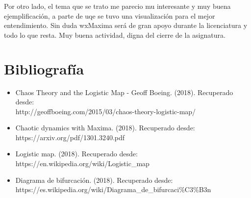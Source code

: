 \documentclass[12pt]{article}
\begin{document}
Por otro lado, el tema que se trato me parecio mu interesante y muy buena ejemplificación, a parte de uqe se tuvo una visualización para el mejor entendimiento. Sin duda wxMaxima será de gran apoyo durante la licenciatura y todo lo que resta. Muy buena actividad, digna del cierre de la asignatura.

\newpage

\section*{Bibliografía}
\begin{itemize}
\item  Chaos Theory and the Logistic Map - Geoff Boeing. (2018). Recuperado desde:\\ http://geoffboeing.com/2015/03/chaos-theory-logistic-map/

\item Chaotic dynamics with Maxima. (2018). Recuperado desde:\\ https://arxiv.org/pdf/1301.3240.pdf

\item Logistic map. (2018). Recuperado desde:\\ https://en.wikipedia.org/wiki/Logistic\_map

\item Diagrama de bifurcación. (2018). Recuperado desde:\\ https://es.wikipedia.org/wiki/Diagrama\_de\_bifurcaci\%C3\%B3n
\end{itemize}
\end{document}
